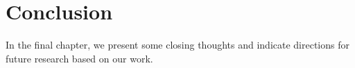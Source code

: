 
\chapter{Conclusion}\label{chapter:future_work_and_conclusion}

In the final chapter, we present some closing thoughts and indicate directions for future research based on our work.






